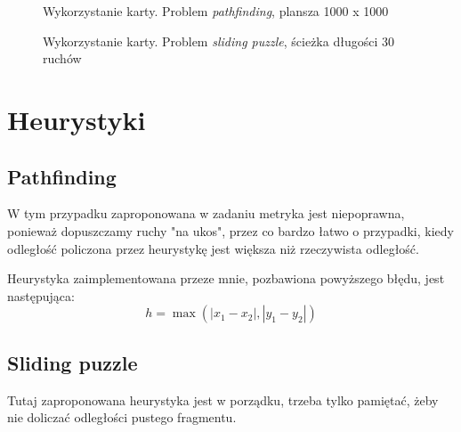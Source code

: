 \documentclass{article}
\begin{document}
\begin{figure}[htb]
        \caption{\label{fig:path} Wykorzystanie karty. Problem \emph{pathfinding}, plansza 1000 x 1000}
\end{figure}
    
\begin{figure}[htb]
        \caption{\label{fig:sliding} Wykorzystanie karty. Problem \emph{sliding puzzle}, ścieżka długości 30 ruchów}
\end{figure}

\section{Heurystyki}
\subsection{Pathfinding}
W tym przypadku zaproponowana w zadaniu metryka jest niepoprawna, ponieważ dopuszczamy ruchy "na ukos", przez co bardzo łatwo
o przypadki, kiedy odległość policzona przez heurystykę jest większa niż rzeczywista odległość.

Heurystyka zaimplementowana przeze mnie, pozbawiona powyższego błędu, jest następująca:
$$h= \max(|x_1 - x_2|, |y_1 - y_2|)$$

\subsection{Sliding puzzle}
Tutaj zaproponowana heurystyka jest w porządku, trzeba tylko pamiętać, żeby nie doliczać odległości pustego fragmentu.
\end{document}
